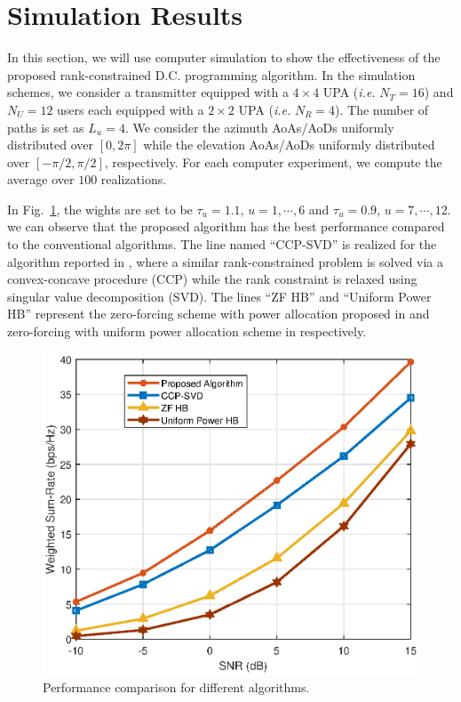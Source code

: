 \documentclass[10pt,journal,twocolumn,twoside]{IEEEtran}
\begin{document}
\section{Simulation Results}
In this section, we will use computer simulation to show the effectiveness of the proposed rank-constrained D.C. programming algorithm. In the simulation schemes, we consider a transmitter equipped with a $4\times 4$ UPA ({\em i.e.} $N_T=16$) and $N_U=12$ users each equipped with a $2\times 2$ UPA ({\em i.e.} $N_R=4$). The number of paths is set as $L_{u} = 4$. We consider the azimuth AoAs/AoDs uniformly distributed over $[0, 2\pi]$ while the elevation AoAs/AoDs uniformly distributed over $[-\pi/2, \pi/2]$, respectively. For each computer experiment, we compute the average over $100$ realizations.

In Fig.~\ref{fig:comparison}, the wights are set to be $\tau_u = 1.1$, $u = 1,\cdots, 6$ and $\tau_u = 0.9$, $u = 7,\cdots, 12$.  we can observe that the proposed algorithm has the best performance compared to the conventional algorithms. The line named ``CCP-SVD'' is realized for the algorithm reported in \cite{hu2018joint}, where a similar rank-constrained problem is solved via a convex-concave procedure (CCP) while the rank constraint is relaxed using singular value decomposition (SVD). The lines ``ZF HB'' and ``Uniform Power HB'' represent the zero-forcing scheme with power allocation proposed in \cite{kha2012fast} and zero-forcing with uniform power allocation scheme in \cite{alkhateeb2014channel} respectively.

\begin{figure}[ht]
	\begin{center}
		\includegraphics[scale=0.62]{Figure/comparison.eps}
		\caption{Performance comparison for different algorithms.}\label{fig:comparison}
	\end{center}
\end{figure}
\end{document}

